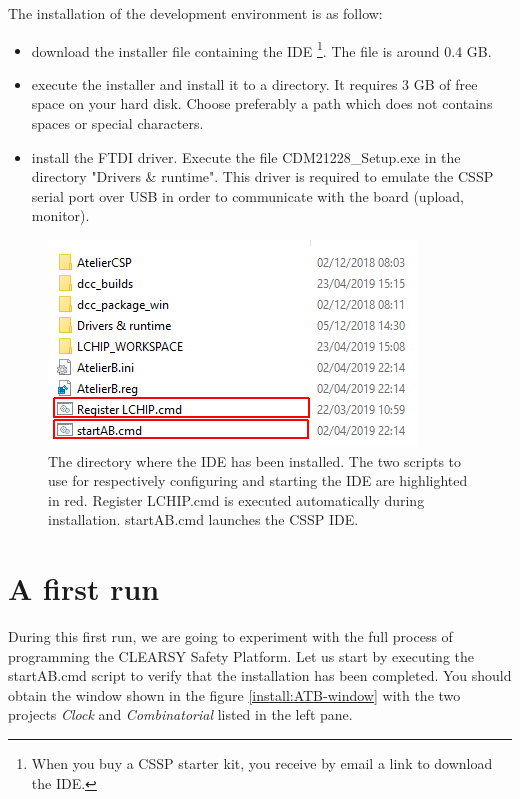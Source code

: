The installation of the development environment is as follow:
\begin{itemize}
    \item download the installer file containing the IDE \footnote{When you buy a CSSP starter kit, you receive by email a link to download the IDE.}. The file is around 0.4 GB. 
    \item execute the installer and install it to a directory. It requires 3 GB of free space on your hard disk.  Choose preferably a path which does not contains spaces or special characters. 
        \item install the FTDI driver. Execute the file CDM21228\_Setup.exe in the directory "Drivers \& runtime". This driver is required to emulate the CSSP serial port over USB in order to communicate with the board (upload, monitor).
\end{itemize}  

\begin{figure}[ht]
\centering\includegraphics[scale=0.5]{Pictures/chapterProgramming/INSTALL-directory.png}
\caption{The directory where the IDE has been installed. The two scripts to use for respectively configuring and starting the IDE are highlighted in red. Register LCHIP.cmd is executed automatically during installation. startAB.cmd launches the CSSP IDE.}
\label{install:directory}
\end{figure}



\section{A first run}
During this first run, we are going to experiment with the full process of programming the CLEARSY Safety Platform. Let us start by executing the startAB.cmd script to verify that the installation has been completed. You should obtain the window shown in the figure \ref{install:ATB-window} with the two projects \textit{Clock} and \textit{Combinatorial} listed in the left pane.


